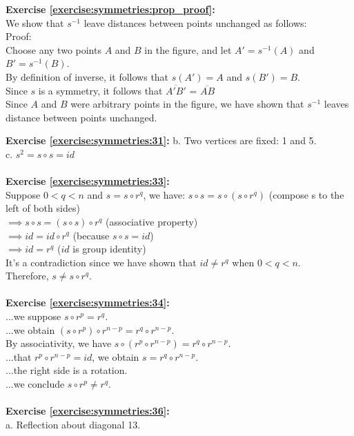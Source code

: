 \noindent\textbf{Exercise \ref{exercise:symmetries:prop_proof}:}\\
We show that $s^{-1}$ leave distances between points unchanged as follows:\\
Proof:\\
Choose any two points $A$ and $B$ in the figure, and let $A'=s^{-1}(A)$ and $B'=s^{-1}(B)$.\\
By definition of inverse, it follows that $s(A')=A$ and $s(B')=B$.\\
Since $s$ is a symmetry, it follows that $\overline{A'B'}$ = $\overline{AB}$\\
Since $A$ and $B$ were arbitrary points in the figure, we have shown that $s^{-1}$ leaves distance between points unchanged.

\noindent\textbf{Exercise \ref{exercise:symmetries:31}:}
b. Two vertices are fixed: 1 and 5.\\
c. $s^2=s\circ s=id$\\
\\
\textbf{Exercise \ref{exercise:symmetries:33}:}\\
Suppose $0<q<n$ and $s=s\circ r^q$, we have:
$s\circ s=s\circ(s\circ r^q)$ (compose s to the left of both sides)\\
$\implies s\circ s=(s\circ s)\circ r^q$ (associative property)\\
$\implies id=id\circ r^q$ (because $s\circ s=id$)\\
$\implies id=r^q$ ($id$ is group identity)\\
It's a contradiction since we have shown that $id\neq r^q$ when $0<q<n$.\\
Therefore, $s\neq s\circ r^q$.\\
\\
\textbf{Exercise \ref{exercise:symmetries:34}:}\\
...we suppose $s\circ r^p=r^q$.\\
...we obtain $(s\circ r^p)\circ r^{n-p}=r^q\circ r^{n-p}$.\\
By associativity, we have $s\circ (r^p\circ r^{n-p})=r^q\circ r^{n-p}$.\\
...that $r^p\circ r^{n-p}=id$, we obtain $s=r^q\circ r^{n-p}$.\\
...the right side is a rotation.\\
...we conclude $s\circ r^p\neq r^q$.\\
\\
\textbf{Exercise \ref{exercise:symmetries:36}:}\\
a. Reflection about diagonal 13.\\

